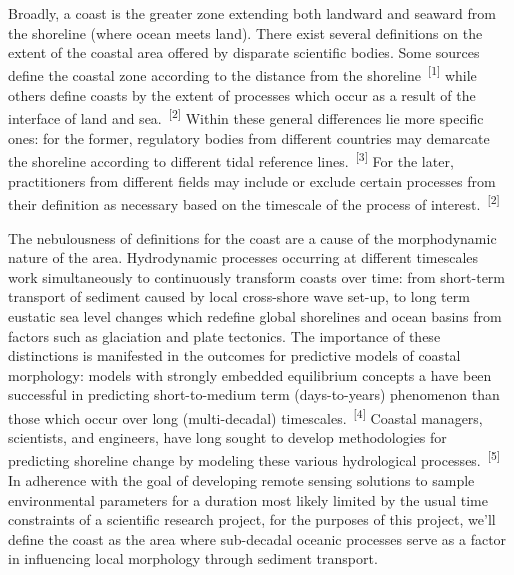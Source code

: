 \documentclass{article}
\begin{document}
\par{\hspace{.5cm}Broadly, a coast is the greater zone extending both landward and seaward from the shoreline (where ocean meets land). There exist several definitions on the extent of the coastal area offered by disparate scientific bodies. Some sources define the coastal zone according to the distance from the shoreline~\textsuperscript{[1]} while others define coasts by the extent of processes which occur as a result of the interface of land and sea.~\textsuperscript{[2]} Within these general differences lie more specific ones: for the former, regulatory bodies from different countries may demarcate the shoreline according to different tidal reference lines.~\textsuperscript{[3]} For the later, practitioners from different fields may include or exclude certain processes from their definition as necessary based on the timescale of the process of interest.~\textsuperscript{[2]}}


\par{The nebulousness of definitions for the coast are a cause of the morphodynamic nature of the area. Hydrodynamic processes occurring at different timescales work simultaneously to continuously transform coasts over time: from short-term transport of sediment caused by local cross-shore wave set-up, to long term eustatic sea level changes which redefine global shorelines and ocean basins from factors such as glaciation and plate tectonics. The importance of these distinctions is manifested in the outcomes for predictive models of coastal morphology: models with strongly embedded equilibrium concepts a have been successful in predicting short-to-medium term (days-to-years) phenomenon than those which occur over long (multi-decadal) timescales.~\textsuperscript{[4]} Coastal managers, scientists, and engineers, have long sought to develop methodologies for predicting shoreline change by modeling these various hydrological processes.~\textsuperscript{[5]} In adherence with the goal of developing remote sensing solutions to sample environmental parameters for a duration most likely limited by the usual time constraints of a scientific research project, for the purposes of this project, we'll define the coast as the area where sub-decadal oceanic processes serve as a factor in influencing local morphology through sediment transport.}

\end{document}

